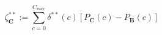 \begin{equation}
 \zeta_\textbf{C}^{**} := \sum_{c = 0}^{C_{max}} \delta^{**}(c) \left[P_\textbf{C}(c) - P_\textbf{B}(c)\right]
 \label{ch1:equ:utilisation-metric}
\end{equation}
